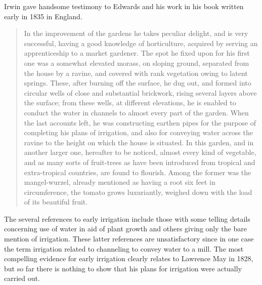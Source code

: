 Irwin gave handsome testimony to Edwards and his work in his book
written early in 1835 in England.
\begin{quote}
	In the improvement of the gardens he takes peculiar delight,
	and is very successful, having a good knowledge of
	horticulture, acquired by serving an apprenticeship to a
	market gardener.  The spot he fixed upon for his first one was
	a somewhat elevated morass, on sloping ground, separated from
	the house by a ravine, and covered with rank vegetation owing
	to latent springs.  These, after burning off the surface, he
	dug out, and formed into circular wells of close and
	substantial brickwork, rising several layers above the
	surface; from these wells, at different elevations, he is
	enabled to conduct the water in channels to almost every part
	of the garden.  When the last accounts left, he was
	constructing earthen pipes for the purpose of completing his
	plans of irrigation, and also for conveying water across the
	ravine to the height on which the house is situated.  In this
	garden, and in another larger one, hereafter to be noticed,
	almost every kind of vegetable, and as many sorts of
	fruit-trees as have been introduced from tropical and
	extra-tropical countries, are found to flourish.  Among the
	former was the mangel-wurzel, already mentioned as having a
	root six feet in circumference, the tomato grows luxuriantly,
	weighed down with the load of its beautiful
	fruit.
\end{quote}


\closure
The several references to early irrigation include those with some
telling details concerning use of water in aid of plant growth and
others giving only the bare mention of irrigation. These latter
references are unsatisfactory since in one case the term irrigation
related to channeling to convey water to a mill.  The most compelling
evidence for early irrigation clearly relates to Lawrence May in 1828,
but so far there is nothing to show that his plans for irrigation were
actually carried out.

